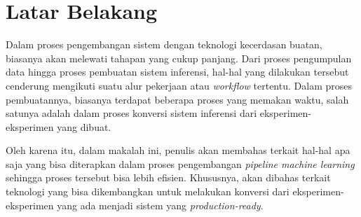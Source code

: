 \section{Latar Belakang}

Dalam proses pengembangan sistem dengan teknologi kecerdasan buatan, biasanya akan melewati tahapan yang cukup panjang.
Dari proses pengumpulan data hingga proses pembuatan sistem inferensi, hal-hal yang dilakukan tersebut cenderung mengikuti suatu alur pekerjaan atau \textit{workflow} tertentu.
Dalam proses pembuatannya, biasanya terdapat beberapa proses yang memakan waktu, salah satunya adalah dalam proses konversi sistem inferensi dari eksperimen-eksperimen yang dibuat.

Oleh karena itu, dalam makalah ini, penulis akan membahas terkait hal-hal apa saja yang bisa diterapkan dalam proses pengembangan \textit{pipeline machine learning} sehingga proses tersebut bisa lebih efisien.
Khususnya, akan dibahas terkait teknologi yang bisa dikembangkan untuk melakukan konversi dari eksperimen-eksperimen yang ada menjadi sistem yang \textit{production-ready}.
